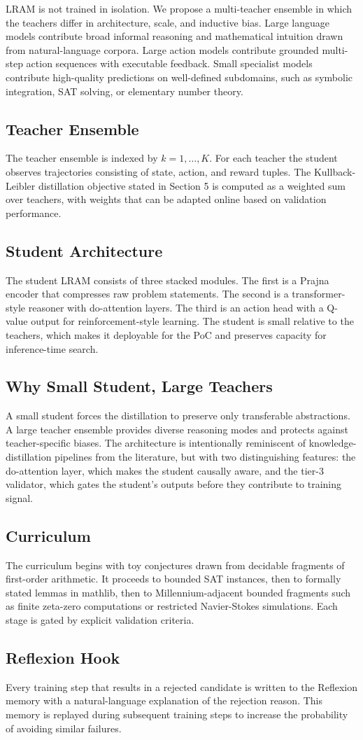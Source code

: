 LRAM is not trained in isolation. We propose a multi-teacher ensemble in which the teachers differ in architecture, scale, and inductive bias. Large language models contribute broad informal reasoning and mathematical intuition drawn from natural-language corpora. Large action models contribute grounded multi-step action sequences with executable feedback. Small specialist models contribute high-quality predictions on well-defined subdomains, such as symbolic integration, SAT solving, or elementary number theory.

\subsection{Teacher Ensemble}
The teacher ensemble is indexed by $k = 1, \ldots, K$. For each teacher the student observes trajectories consisting of state, action, and reward tuples. The Kullback-Leibler distillation objective stated in Section 5 is computed as a weighted sum over teachers, with weights that can be adapted online based on validation performance.

\subsection{Student Architecture}
The student LRAM consists of three stacked modules. The first is a Prajna encoder that compresses raw problem statements. The second is a transformer-style reasoner with do-attention layers. The third is an action head with a Q-value output for reinforcement-style learning. The student is small relative to the teachers, which makes it deployable for the PoC and preserves capacity for inference-time search.

\subsection{Why Small Student, Large Teachers}
A small student forces the distillation to preserve only transferable abstractions. A large teacher ensemble provides diverse reasoning modes and protects against teacher-specific biases. The architecture is intentionally reminiscent of knowledge-distillation pipelines from the literature, but with two distinguishing features: the do-attention layer, which makes the student causally aware, and the tier-3 validator, which gates the student's outputs before they contribute to training signal.

\subsection{Curriculum}
The curriculum begins with toy conjectures drawn from decidable fragments of first-order arithmetic. It proceeds to bounded SAT instances, then to formally stated lemmas in mathlib, then to Millennium-adjacent bounded fragments such as finite zeta-zero computations or restricted Navier-Stokes simulations. Each stage is gated by explicit validation criteria.

\subsection{Reflexion Hook}
Every training step that results in a rejected candidate is written to the Reflexion memory with a natural-language explanation of the rejection reason. This memory is replayed during subsequent training steps to increase the probability of avoiding similar failures.
